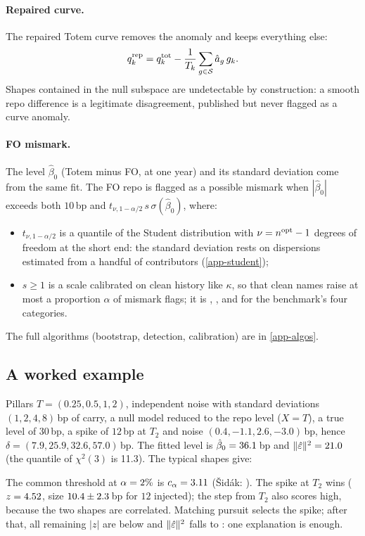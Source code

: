 \paragraph{Repaired curve.} The repaired Totem curve removes the anomaly and keeps everything else:
\[
q^{\mathrm{rep}}_k=q^{\mathrm{tot}}_k-\frac{1}{T_k}\sum_{g\in\mathcal S}\hat a_g\,g_k .
\]
Shapes contained in the null subspace are undetectable by construction: a smooth repo difference is a legitimate
disagreement, published but never flagged as a curve anomaly.

\paragraph{FO mismark.} The level $\hat\beta_0$ (Totem minus FO, at one year) and its standard deviation come from the
same fit. The FO repo is flagged as a possible mismark when $|\hat\beta_0|$ exceeds both $10$\,bp and
$t_{\nu,1-\alpha/2}\,s\,\sigma(\hat\beta_0)$, where:
\begin{itemize}
\item $t_{\nu,1-\alpha/2}$ is a quantile of the Student distribution with $\nu=n^{\mathrm{opt}}-1$ degrees of freedom at the
short end: the standard deviation rests on dispersions estimated from a handful of contributors (\cref{app-student});
\item $s\ge1$ is a scale calibrated on clean history like $\kappa$, so that clean names raise at most a proportion
$\alpha$ of mismark flags; it is \vLevelScaleEuStock, \vLevelScaleUsStock, \vLevelScaleHtb{} and \vLevelScaleIndex{}
for the benchmark's four categories.
\end{itemize}
The full algorithms (bootstrap, detection, calibration) are in \cref{app-algos}.

\subsection{A worked example}
\begin{example}\label{ex-toy}
Pillars $T=(\num{0.25}, \num{0.5}, 1, 2)$, independent noise with standard deviations $(1, 2, 4, 8)$\,bp of carry, a null
model reduced to the repo level ($X=T$), a true level of $30$\,bp, a spike of $12$\,bp at $T_2$ and noise
$(\num{0.4}, \num{-1.1}, \num{2.6}, \num{-3.0})$\,bp, hence $\delta=(\num{7.9}, \num{25.9}, \num{32.6}, \num{57.0})$\,bp. The
fitted level is $\hat\beta_0=\num{36.1}$\,bp and $\lVert \hat\varepsilon\rVert^2=\num{21.0}$ (the  quantile of $\chi^2(3)$ is
\num{11.3}). The \vToyM{} typical shapes give:
\begin{center}\end{center}
The common threshold at $\alpha=\pct{2}$ is $c_\alpha=\num{3.11}$ (Šidák: \vToyCsidak). The spike at $T_2$ wins
($z=\num{4.52}$, size $\num{10.4}\pm\num{2.3}$\,bp for $12$ injected); the step from $T_2$ also scores high, because
the two shapes are correlated. Matching pursuit selects the spike; after that, all remaining $|z|$ are below
\vToyZafter{} and $\lVert \hat\varepsilon\rVert^2$ falls to \vToyQafter: one explanation is enough.
\end{example}

